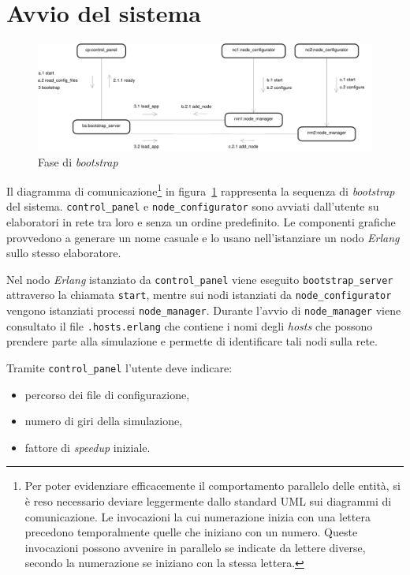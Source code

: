 \documentclass[11pt,a4paper]{report}
\newcommand{\Erlang}{\textsl{Erlang}}
\newcommand{\fun}[1]{\texttt{#1}}
\begin{document}
\section{Avvio del sistema}
\label{sec:avvio}

\begin{landscape}
\begin{figure}
\includegraphics[height=.25\paperheight]{diagrammi/Bootstrap}
\caption{Fase di \textit{bootstrap}}
\label{fig:bootstrap}
\end{figure}
\end{landscape}

Il diagramma di comunicazione\footnote{Per poter evidenziare efficacemente il comportamento parallelo delle entità, si è reso necessario deviare leggermente dallo standard UML sui diagrammi di comunicazione. Le invocazioni la cui numerazione inizia con una lettera precedono temporalmente quelle che iniziano con un numero. Queste invocazioni possono avvenire in parallelo se indicate da lettere diverse, secondo la numerazione se iniziano con la stessa lettera.} in figura~\ref{fig:bootstrap} rappresenta la sequenza di \textit{bootstrap} del sistema. \texttt{control\_panel} e \texttt{node\_configurator} sono avviati dall'utente su elaboratori in rete tra loro e senza un ordine predefinito. Le componenti grafiche provvedono a generare un nome casuale e lo usano nell'istanziare un nodo \Erlang{} sullo stesso elaboratore.

Nel nodo \Erlang{} istanziato da \texttt{control\_panel} viene eseguito \texttt{bootstrap\_server} attraverso la chiamata \fun{start}, mentre sui nodi istanziati da \texttt{node\_configurator} vengono istanziati processi \texttt{node\_manager}. Durante l'avvio di \texttt{node\_manager} viene consultato il file \texttt{.hosts.erlang} che contiene i nomi degli \textit{hosts} che possono prendere parte alla simulazione e permette di identificare tali nodi sulla rete.

Tramite \texttt{control\_panel} l'utente deve indicare:
\begin{itemize}
\item percorso dei file di configurazione,
\item numero di giri della simulazione,
\item fattore di \textit{speedup} iniziale.
\end{itemize}
\end{document}
